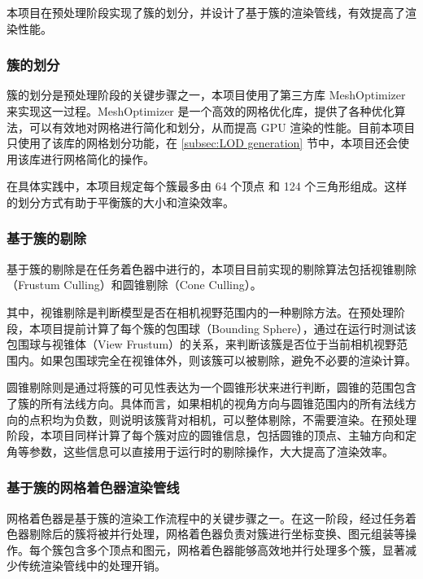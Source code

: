 本项目在预处理阶段实现了簇的划分，并设计了基于簇的渲染管线，有效提高了渲染性能。

\subsubsection{簇的划分} \label{subsubsec:cluster division}

簇的划分是预处理阶段的关键步骤之一，本项目使用了第三方库 MeshOptimizer 来实现这一过程\cite{meshoptimizer}。MeshOptimizer 是一个高效的网格优化库，提供了各种优化算法，可以有效地对网格进行简化和划分，从而提高 GPU 渲染的性能。目前本项目只使用了该库的网格划分功能，在 \ref{subsec:LOD generation} 节中，本项目还会使用该库进行网格简化的操作。

在具体实践中，本项目规定每个簇最多由 64 个顶点 和 124 个三角形组成。这样的划分方式有助于平衡簇的大小和渲染效率\cite{Kubisch2018}。

\subsubsection{基于簇的剔除} \label{subsubsec:cluster culling}

基于簇的剔除是在任务着色器中进行的，本项目目前实现的剔除算法包括视锥剔除（Frustum Culling）和圆锥剔除（Cone Culling）。

其中，视锥剔除是判断模型是否在相机视野范围内的一种剔除方法。在预处理阶段，本项目提前计算了每个簇的包围球（Bounding Sphere），通过在运行时测试该包围球与视锥体（View Frustum）的关系，来判断该簇是否位于当前相机视野范围内。如果包围球完全在视锥体外，则该簇可以被剔除，避免不必要的渲染计算。

圆锥剔除则是通过将簇的可见性表达为一个圆锥形状来进行判断，圆锥的范围包含了簇的所有法线方向。具体而言，如果相机的视角方向与圆锥范围内的所有法线方向的点积均为负数，则说明该簇背对相机，可以整体剔除，不需要渲染。在预处理阶段，本项目同样计算了每个簇对应的圆锥信息，包括圆锥的顶点、主轴方向和定角等参数，这些信息可以直接用于运行时的剔除操作，大大提高了渲染效率。

\subsubsection{基于簇的网格着色器渲染管线}

网格着色器是基于簇的渲染工作流程中的关键步骤之一。在这一阶段，经过任务着色器剔除后的簇将被并行处理，网格着色器负责对簇进行坐标变换、图元组装等操作。每个簇包含多个顶点和图元，网格着色器能够高效地并行处理多个簇，显著减少传统渲染管线中的处理开销\cite{Santerre2020}。

